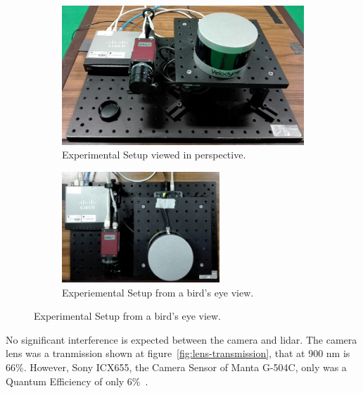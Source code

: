 \begin{figure}[H]
	\centering
	\begin{subfigure}[c]{0.45\textwidth}
		\includegraphics[width=\textwidth]{img/experimental-setup/table-setup-cambada-perspective.jpg}
		\caption{Experimental Setup viewed in perspective.}
		\label{fig:experimental-setup:perspective}
	\end{subfigure}
	\qquad
	\begin{subfigure}[c]{0.45\textwidth}
		\includegraphics[width=0.65\textwidth, keepaspectratio, angle=90]{img/experimental-setup/table-setup-cambada-birds-eye.jpg}
		\caption{Experiemental Setup from a bird's eye view.}
		\label{fig:experimental-setup:birds-eye}
	\end{subfigure}
	\caption{Experimental Setup from a bird's eye view.}
	\label{fig:experimental-setup}
\end{figure}

No significant interference is expected between the camera and \ac{lidar}. The camera lens was a tranmission shown at figure~\ref{fig:lens-transmission}, that at 900 nm is 66\%. However, Sony ICX655, the Camera Sensor of Manta G-504C, only was a Quantum Efficiency of only 6\%~\cite{MantaG504C}.

